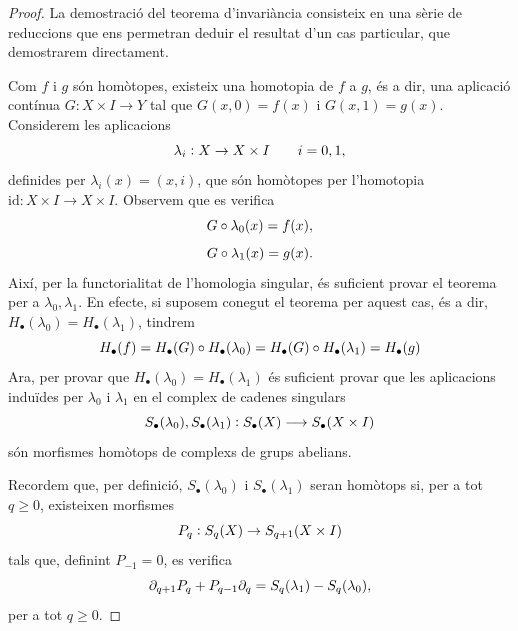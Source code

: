 \documentclass[../main.tex]{subfiles}
\begin{document}
\begin{proof}
La demostració del teorema d'invariància consisteix en una sèrie de reduccions que ens permetran deduir el resultat d'un cas particular, que demostrarem directament.

Com $f$ i $g$ són homòtopes, existeix una homotopia de $f$ a $g$, és a dir, una aplicació contínua $G:X\times I\rightarrow Y$ tal que $G(x,0) = f(x)$ i $G(x,1) = g(x)$. Considerem les aplicacions
\begin{equation}
    \notag
    \lambda_i:X\rightarrow X\times I\qquad i=0,1,
\end{equation}
definides per $\lambda_i(x) = (x,i)$, que són homòtopes per l'homotopia $\mathrm{id}:X\times I\rightarrow X\times I$. Observem que es verifica 
\begin{equation}
    \notag
    G\circ \lambda_0(x) = f(x),
\end{equation}
\begin{equation}
    \notag
    G\circ\lambda_1(x) = g(x).
\end{equation}
Així, per la functorialitat de l'homologia singular, és suficient provar el teorema per a $\lambda_0,\lambda_1$. En efecte, si suposem conegut el teorema per aquest cas, és a dir, $H_\bullet(\lambda_0) = H_\bullet(\lambda_1)$, tindrem 
\begin{equation}
    \notag
    H_\bullet(f) = H_\bullet(G)\circ H_\bullet(\lambda_0) = H_\bullet(G)\circ H_\bullet(\lambda_1) = H_\bullet(g)
\end{equation}
Ara, per provar que $H_\bullet(\lambda_0) = H_\bullet(\lambda_1)$ és suficient provar que les aplicacions induïdes per $\lambda_0$ i $\lambda_1$ en el complex de cadenes singulars
\begin{equation}
    \notag
    S_\bullet(\lambda_0),S_\bullet(\lambda_1):S_\bullet(X)\longrightarrow S_\bullet(X\times I)
\end{equation}
són morfismes homòtops de complexs de grups abelians.

Recordem que, per definició, $S_\bullet(\lambda_0)$ i $S_\bullet(\lambda_1)$ seran homòtops si, per a tot $q\geq 0$, existeixen morfismes
\begin{equation}
    \notag
    P_q:S_q(X)\rightarrow S_{q+1}(X\times I)
\end{equation}
tals que, definint $P_{-1} = 0$, es verifica
\begin{equation}
    \notag
    \partial_{q+1}P_q + P_{q-1}\partial_q = S_q(\lambda_1)-S_q(\lambda_0),
\end{equation}
per a tot $q\geq 0$.


\end{proof}
\end{document}
